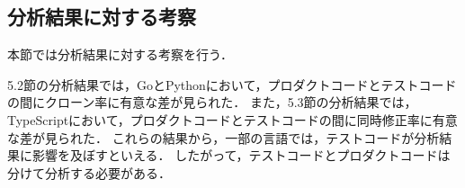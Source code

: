 \documentclass[T,J]{fose}
\begin{document}
\subsection{分析結果に対する考察}
本節では分析結果に対する考察を行う．




5.2節の分析結果では，GoとPythonにおいて，プロダクトコードとテストコードの間にクローン率に有意な差が見られた．
また，5.3節の分析結果では，TypeScriptにおいて，プロダクトコードとテストコードの間に同時修正率に有意な差が見られた．
これらの結果から，一部の言語では，テストコードが分析結果に影響を及ぼすといえる．
したがって，テストコードとプロダクトコードは分けて分析する必要がある．
\end{document}
